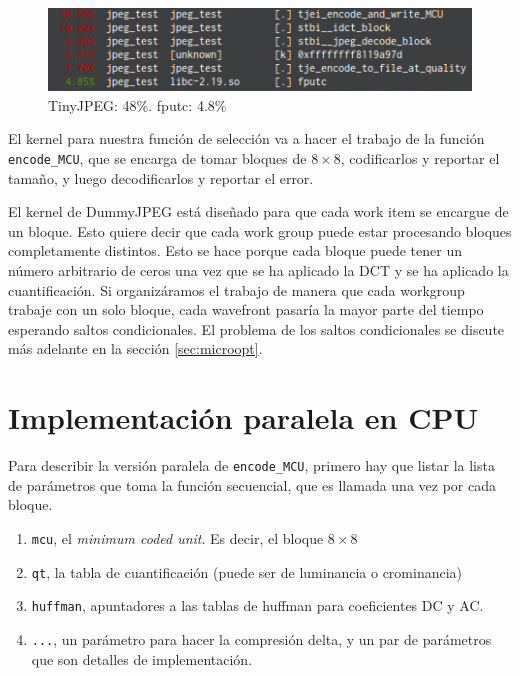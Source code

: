 \begin{figure}[hb]
    \includegraphics[width=4.5625in]{fputc}
    \caption{TinyJPEG: 48\%. fputc: 4.8\%}
\end{figure}

El kernel para nuestra función de selección va a hacer el trabajo de la función
\verb+encode_MCU+, que se encarga de tomar bloques de $8\times8$, codificarlos
y reportar el tamaño, y luego decodificarlos y reportar el error.

El kernel de DummyJPEG está diseñado para que cada work item se encargue de un
bloque. Esto quiere decir que cada work group puede estar procesando bloques
completamente distintos. Esto se hace porque cada bloque puede tener un número
arbitrario de ceros una vez que se ha aplicado la \gls{DCT} y se ha aplicado la
cuantificación. Si organizáramos el trabajo de manera que cada workgroup trabaje
con un solo bloque, cada wavefront pasaría la mayor parte del tiempo esperando saltos
condicionales. El problema de los saltos condicionales se discute más adelante
en la sección \ref{sec:microopt}.

\section{Implementación paralela en CPU}

Para describir la versión paralela de \verb+encode_MCU+, primero hay que listar
la lista de parámetros que toma la función secuencial, que es llamada una vez
por cada bloque.

\begin{enumerate}
    \item \verb+mcu+, el \emph{minimum coded unit}. Es decir, el bloque
        $8\times8$
    \item \verb+qt+, la tabla de cuantificación (puede ser de luminancia o
        crominancia)
    \item \verb+huffman+, apuntadores a las tablas de huffman para coeficientes
        DC y AC.
    \item \verb+...+, un parámetro para hacer la compresión delta, y un par de
        parámetros que son detalles de implementación.
\end{enumerate}

